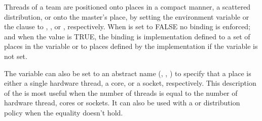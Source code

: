 
Threads of a team are positioned onto places in a compact manner, a 
scattered distribution, or onto the master's place, by setting the 
 environment variable or the  clause  to 
, , or , respectively.  When 
 is set to FALSE no binding is enforced; and 
when the value is TRUE, the binding is implementation defined to 
a set of places in the  variable or to places 
defined by the implementation if the  variable 
is not set.

The  variable can also be set to an abstract name 
(, , ) to specify that a place is
either a single hardware thread, a core, or a socket, respectively. 
This description of the  is most useful when the 
number of threads is equal to the number of hardware thread, cores
or sockets.  It can also be used with a  or  
distribution policy when the equality doesn't hold.




%   
%     

%   
%    
%     

